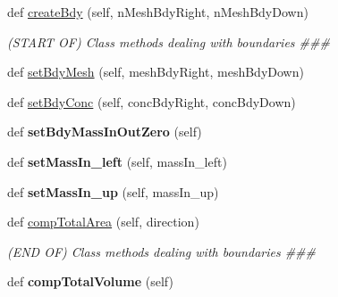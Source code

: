 \begin{DoxyCompactItemize}
\item 
def \hyperlink{classcomp_1_1Comp_af89f05ea9ea53f88ecfa59a503827d23}{create\+Bdy} (self, n\+Mesh\+Bdy\+Right, n\+Mesh\+Bdy\+Down)
\begin{DoxyCompactList}\small\item\em (S\+T\+A\+RT OF) Class methods dealing with boundaries \#\#\# \end{DoxyCompactList}\item 
def \hyperlink{classcomp_1_1Comp_a35ef9e925796bb10640cfe40d5f82c4b}{set\+Bdy\+Mesh} (self, mesh\+Bdy\+Right, mesh\+Bdy\+Down)
\item 
def \hyperlink{classcomp_1_1Comp_a9515ffba9a1e5a0de8542cb736e8ece4}{set\+Bdy\+Conc} (self, conc\+Bdy\+Right, conc\+Bdy\+Down)
\item 
def {\bfseries set\+Bdy\+Mass\+In\+Out\+Zero} (self)\hypertarget{classcomp_1_1Comp_a3811398d197bce2ff384b4f3610eeb0a}{}\label{classcomp_1_1Comp_a3811398d197bce2ff384b4f3610eeb0a}

\item 
def {\bfseries set\+Mass\+In\+\_\+left} (self, mass\+In\+\_\+left)\hypertarget{classcomp_1_1Comp_a86835c18bf9c9b7ce67d0362fc2bd165}{}\label{classcomp_1_1Comp_a86835c18bf9c9b7ce67d0362fc2bd165}

\item 
def {\bfseries set\+Mass\+In\+\_\+up} (self, mass\+In\+\_\+up)\hypertarget{classcomp_1_1Comp_a704cddd08bfe38a86e5658744f33a4de}{}\label{classcomp_1_1Comp_a704cddd08bfe38a86e5658744f33a4de}

\item 
def \hyperlink{classcomp_1_1Comp_af6d700899b8a97e67233d25626554263}{comp\+Total\+Area} (self, direction)
\begin{DoxyCompactList}\small\item\em (E\+ND OF) Class methods dealing with boundaries \#\#\# \end{DoxyCompactList}\item 
def {\bfseries comp\+Total\+Volume} (self)\hypertarget{classcomp_1_1Comp_ac8ec3d15a67a816e5a42ff5facf6753b}{}\label{classcomp_1_1Comp_ac8ec3d15a67a816e5a42ff5facf6753b}


\end{DoxyCompactItemize}
